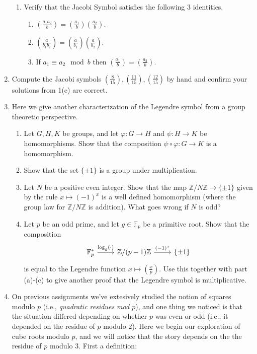 \documentclass[11pt]{article}
\newcommand{\bF}{\mathbb{F}}
\newcommand{\bZ}{\mathbb{Z}}
\begin{document}
\begin{enumerate}
{\begin{enumerate}
    \item{Verify that the Jacobi Symbol satisfies the following 3 identities.}
    \begin{enumerate}
      \item{
      $\left(\frac{a_1a_2}{b}\right) = \left(\frac{a_1}{b}\right)\left(\frac{a_2}{b}\right).$
      }
      \item{
      $\left(\frac{a}{b_1b_2}\right) = \left(\frac{a}{b_1}\right)\left(\frac{a}{b_2}\right).$
      }
      \item{
      If $a_1\equiv a_2\mod b$ then $\left(\frac{a_1}{b}\right) = \left(\frac{a_2}{b}\right)$.
      }
    \end{enumerate}
  \end{enumerate}
    }
  \item{
  Compute the Jacobi symbols $\left(\frac{8}{15}\right),\left(\frac{11}{15}\right),\left(\frac{12}{15}\right)$ by hand and confirm your solutions from 1(c) are correct.
  }
  \item{
  Here we give another characterization of the Legendre symbol from a group theoretic perspective.
  \begin{enumerate}
    \item{
    Let $G,H,K$ be groups, and let $\varphi:G\to H$ and $\psi:H\to K$ be homomorphisms.  Show that the composition $\psi\circ\varphi:G\to K$ is a homomorphism.
    }
    \item{
    Show that the set $\{\pm1\}$ is a group under multiplication.
    }
    \item{
    Let $N$ be a positive even integer.  Show that the map $\bZ/N\bZ\to\{\pm1\}$ given by the rule $x\mapsto (-1)^x$ is a well defined homomorphism (where the group law for $\bZ/N\bZ$ is addition).  What goes wrong if $N$ is odd?
    }
    \item{
    Let $p$ be an odd prime, and let $g\in\bF_p$ be a primitive root.  Show that the composition
    \[
    \begin{tikzcd}
      \bF_p^*\ar[r,"\log_g(\cdot)"]&\bZ/(p-1)\bZ\ar[r,"(-1)^x"]&\{\pm1\}
    \end{tikzcd}
    \]
    is equal to the Legendre function $x\mapsto\left(\frac{x}{p}\right)$.  Use this together with part (a)-(c) to give another proof that the Legendre symbol is multiplicative.
    }
  \end{enumerate}
  }
  \item{
  On previous assignments we've extesively studied the notion of squares modulo $p$ (i.e., \textit{quadratic residues mod $p$}), and one thing we noticed is that the situation differed depending on whether $p$ was even or odd (i.e., it depended on the residue of $p$ modulo $2$).  Here we begin our exploration of cube roots modulo $p$, and we will notice that the story depends on the the residue of $p$ modulo 3.  First a definition:
}
\end{enumerate}
\end{document}
